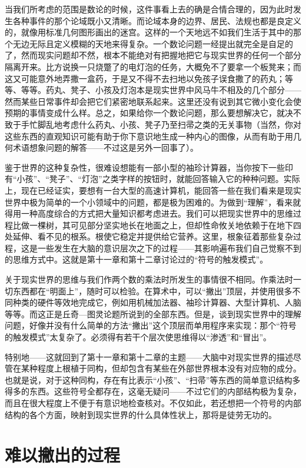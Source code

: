 当我们所考虑的范围是数论的时候，这件事看上去的确是合情合理的，因为此时发生各种事件的那个论域既小又清晰。而论域本身的边界、居民、法规也都是良定义的，就像用标准几何图形画出的迷宫。这样的一个天地远不如我们生活于其中的那个无边无际且定义模糊的天地来得复杂。一个数论问题一经提出就完全是自足的了，然而现实问题却不然，根本不能绝对有把握地把它与现实世界的任何一个部分隔离开来。比方说换一只烧蹩了的电灯泡的任务，大概免不了要拿一个板凳来；而这又可能意外地弄撒一盒药，于是又不得不去扫地以免孩子误食撒了的药丸；等等、等等。药丸、凳子、小孩及灯泡本是现实世界中风马牛不相及的几个部分——然而某些日常事件却会把它们紧密地联系起来。这里还没有说到其它微小变化会使预期的事情变成什么样。总之，如果给你一个数论问题，那么要想解决它，就决不致于手忙脚乱地考虑什么药丸、小孩、凳子乃至扫帚之类的无关事物（当然，你对这些东西的直观知识可能有助于你下意识地生成一种内心的图像，从而有助于用几何术语想象问题的解答——不过这是另外一回事了）。

鉴于世界的这种复杂性，很难设想能有一部小型的袖珍计算器，当你按下一些印有“小孩”、“凳子”、“灯泡”之类字样的按钮时，就能回答输入它的种种问题。实际上，现在已经证实，要想有一台大型的高速计算机，能回答一些在我们看来是现实世界中极为简单的一个小领域中的问题，都是极为困难的。为做到“理解”，看来就得用一种高度综合的方式把大量知识都考虑进去。我们可以把现实世界中的思维过程比做一棵树，其可见部分坚实地长在地面之上，但却性命攸关地依赖于在地下四处延伸、看不见的根系。根使它稳定并提供给它营养。这里，根象征着那些复杂过程，这是一些发生在大脑的意识层次之下的过程——其影响遍布我们自己觉察不到的思维方式中。这就是第十一章和第十二章讨论过的“符号的触发模式”。

关于现实世界的思维与我们作两个数的乘法时所发生的事情很不相同。作乘法时一切东西都在“明面上”，随时可以检验。在算术中，可以“撇出”顶层，并使用很多不同种类的硬件等效地完成它，例如用机械加法器、袖珍计算器、大型计算机、人脑等等。而这正是丘奇—图灵论题所说到的全部东西。但是，谈到现实世界中的理解问题，好像并没有什么简单的方法“撇出”这个顶层而单用程序来实现：那个“符号的触发模式”太复杂了。必须得有若干个层次使思维得以“渗透”和“冒出”。

特别地——这就回到了第十一章和第十二章的主题——大脑中对现实世界的描述尽管在某种程度上根植于同构，但却包含有某些在外部世界根本没有对应物的成分。也就是说，对于这种同构，存在有比表示“小孩”、“扫帚”等东西的简单意识结构多得多的东西。这些符号全都存在，这毫无疑问——不过它们的内部结构极为复杂，而且在很大程度上不便于有意识地检查核对。不仅如此，若还想把一个符号的内部结构的各个方面，映射到现实世界的什么具体性状上，那将是徒劳无功的。

\section{难以撇出的过程}

